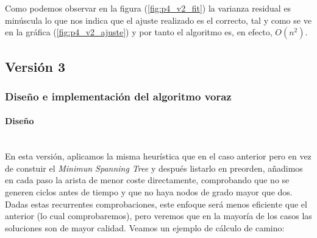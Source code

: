 \documentclass{article}
\newcommand{\myparagraph}[1]{\paragraph{#1}\mbox{}\\}
\begin{document}
Como podemos observar en la figura (\ref{fig:p4_v2_fit}) la varianza residual es minúscula lo que nos indica que el ajuste realizado es el correcto, tal y como se ve en la gráfica (\ref{fig:p4_v2_ajuste}) y por tanto el algoritmo es, en efecto, $O(n^{2})$.

\subsection{Versión 3}
\subsubsection{Diseño e implementación del algoritmo voraz}
\myparagraph{Diseño}
En esta versión, aplicamos la misma heurística que en el caso
anterior pero en vez de constuir el \textit{Minimun Spanning Tree} y después listarlo en preorden, añadimos en cada paso la arista de menor coste directamente, comprobando que no se generen 
ciclos antes de tiempo y que no haya nodos de grado mayor que dos. Dadas estas recurrentes comprobaciones, este enfoque será
menos eficiente que el anterior (lo cual comprobaremos), pero 
veremos que en la mayoría de los casos las soluciones son de
mayor calidad. Veamos un ejemplo de cálculo de camino:
\end{document}
